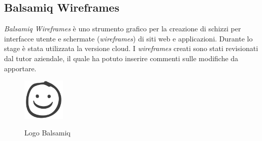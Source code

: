 	\subsection{Balsamiq Wireframes}
	\emph{Balsamiq Wireframes} è uno strumento grafico per la creazione di schizzi per interfacce utente e schermate (\emph{wireframes}) di siti web e applicazioni. Durante lo stage è stata utilizzata la versione cloud. I \emph{wireframes} creati sono stati revisionati dal tutor aziendale, il quale ha potuto inserire commenti sulle modifiche da apportare. 
	
		\begin{figure}[H]
		\centering
		\includegraphics[width=2cm]{immagini/balsamiq.png} \\
		\caption{\label{fig:logo_balsamiq} Logo Balsamiq}
	\end{figure}
	










